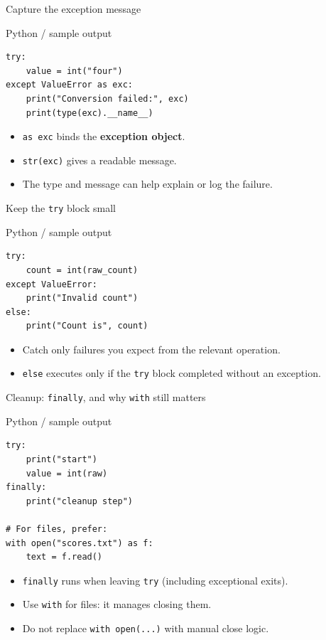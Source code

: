 \documentclass[aspectratio=169,10pt]{beamer}
\begin{document}
\begin{frame}[fragile]{Capture the exception message}
\begin{block}{Python / sample output}
\begin{Verbatim}[fontsize=\footnotesize]
try:
    value = int("four")
except ValueError as exc:
    print("Conversion failed:", exc)
    print(type(exc).__name__)
\end{Verbatim}
\end{block}
\small\begin{itemize}\item \texttt{as exc} binds the \textbf{exception object}.\item \texttt{str(exc)} gives a readable message.\item The type and message can help explain or log the failure.\end{itemize}
\end{frame}
\begin{frame}[fragile]{Keep the \texttt{try} block small}
\begin{block}{Python / sample output}
\begin{Verbatim}[fontsize=\footnotesize]
try:
    count = int(raw_count)
except ValueError:
    print("Invalid count")
else:
    print("Count is", count)
\end{Verbatim}
\end{block}
\small\begin{itemize}\item Catch only failures you expect from the relevant operation.\item \texttt{else} executes only if the \texttt{try} block completed without an exception.\end{itemize}
\end{frame}
\begin{frame}[fragile]{Cleanup: \texttt{finally}, and why \texttt{with} still matters}
\begin{block}{Python / sample output}
\begin{Verbatim}[fontsize=\scriptsize]
try:
    print("start")
    value = int(raw)
finally:
    print("cleanup step")

# For files, prefer:
with open("scores.txt") as f:
    text = f.read()
\end{Verbatim}
\end{block}
\small\begin{itemize}\item \texttt{finally} runs when leaving \texttt{try} (including exceptional exits).\item Use \texttt{with} for files: it manages closing them.\item Do not replace \texttt{with open(...)} with manual close logic.\end{itemize}
\end{frame}
\end{document}

